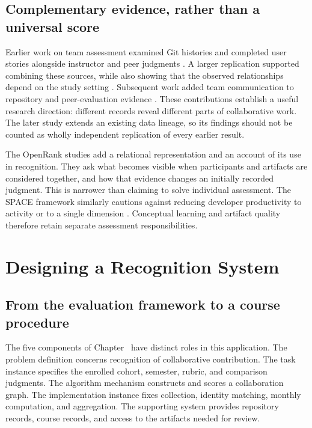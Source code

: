 \subsection{Complementary evidence, rather than a universal score}
Earlier work on team assessment examined Git histories and completed user stories alongside instructor and peer judgments \citep{buffardi2020}. A larger replication supported combining these sources, while also showing that the observed relationships depend on the study setting \citep{hundhausen2022}. Subsequent work added team communication to repository and peer-evaluation evidence \citep{hundhausen2023}. These contributions establish a useful research direction: different records reveal different parts of collaborative work. The later study extends an existing data lineage, so its findings should not be counted as wholly independent replication of every earlier result.

The OpenRank studies add a relational representation and an account of its use in recognition. They ask what becomes visible when participants and artifacts are considered together, and how that evidence changes an initially recorded judgment. This is narrower than claiming to solve individual assessment. The SPACE framework similarly cautions against reducing developer productivity to activity or to a single dimension \citep{forsgren2021}. Conceptual learning and artifact quality therefore retain separate assessment responsibilities.

\section{Designing a Recognition System}
\label{sec:ch7-design}

\subsection{From the evaluation framework to a course procedure}
The five components of Chapter~ have distinct roles in this application. The problem definition concerns recognition of collaborative contribution. The task instance specifies the enrolled cohort, semester, rubric, and comparison judgments. The algorithm mechanism constructs and scores a collaboration graph. The implementation instance fixes collection, identity matching, monthly computation, and aggregation. The supporting system provides repository records, course records, and access to the artifacts needed for review.

